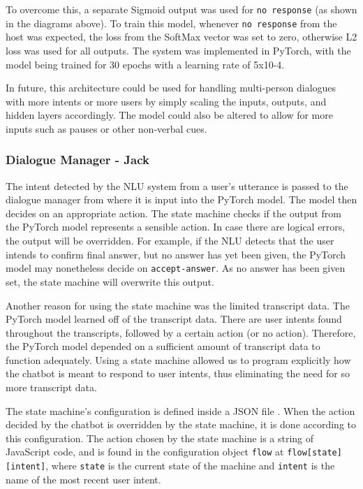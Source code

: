 \documentclass[hidelinks, 11pt]{article}
\begin{document}
To overcome this, a separate Sigmoid output was used for \verb|no response| (as shown in the diagrams above). To train this model, whenever \verb|no response| from the host was expected, the loss from the SoftMax vector was set to zero, otherwise L2 loss was used for all outputs. The system was implemented in PyTorch, with the model being trained for 30 epochs with a learning rate of 5x10-4.

In future, this architecture could be used for handling multi-person dialogues with more intents or more users by simply scaling the inputs, outputs, and hidden layers accordingly. The model could also be altered to allow for more inputs such as pauses or other non-verbal cues.

\subsubsection{Dialogue Manager - Jack}
\label{subsec:dm}

The intent detected by the NLU system from a user's utterance is passed to the dialogue manager from where it is input into the PyTorch model. The model then decides on an appropriate action. The state machine checks if the output from the PyTorch model represents a sensible action. In case there are logical errors, the output will be overridden. For example, if the NLU detects that the user intends to confirm final answer, but no answer has yet been given, the PyTorch model may nonetheless decide on \verb|accept-answer|. As no answer has been given set, the state machine will overwrite this output.

Another reason for using the state machine was the limited transcript data. The PyTorch model learned off of the transcript data. There are user intents found throughout the transcripts, followed by a certain action (or no action). Therefore, the PyTorch model depended on a sufficient amount of transcript data to function adequately. Using a state machine allowed us to program explicitly how the chatbot is meant to respond to user intents, thus eliminating the need for so more transcript data.

The state machine's configuration is defined inside a JSON file . When the action decided by the chatbot is overridden by the state machine, it is done according to this configuration. The action chosen by the state machine is a string of JavaScript code, and is found in the configuration object \verb|flow| at \verb|flow[state][intent]|, where \verb|state| is the current state of the machine and \verb|intent| is the name of the most recent user intent.
\end{document}
